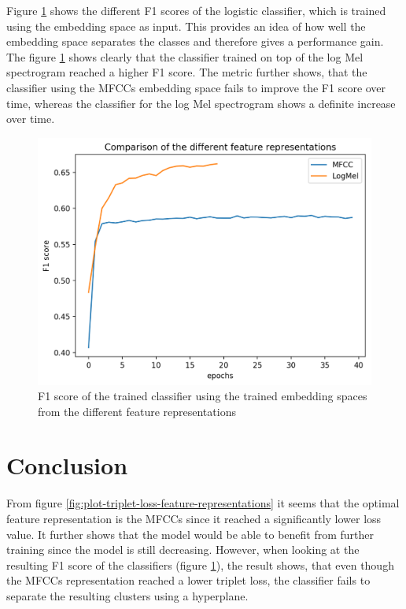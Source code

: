 \documentclass[twocolumn]{article}
\begin{document}
Figure \ref{fig:classifier-f1-feature-represenations} shows the different F1 scores of the logistic classifier, which is trained using the embedding space as input. This provides an idea of how well the embedding space separates the classes and therefore gives a performance gain. The figure \ref{fig:classifier-f1-feature-represenations} shows clearly that the classifier trained on top of the log Mel spectrogram reached a higher F1 score. The metric further shows, that the classifier using the MFCCs embedding space fails to improve the F1 score over time, whereas the classifier for the log Mel spectrogram shows a definite increase over time.

\begin{figure}[t]
\centering
    \includegraphics[width=\linewidth]{assets/f1_feature_representation.png}
    \caption{F1 score of the trained classifier using the trained embedding spaces from the different feature representations}
    \label{fig:classifier-f1-feature-represenations}
\end{figure}

\section{Conclusion}
From figure \ref{fig:plot-triplet-loss-feature-representations} it seems that the optimal feature representation is the MFCCs since it reached a significantly lower loss value. It further shows that the model would be able to benefit from further training since the model is still decreasing. However, when looking at the resulting F1 score of the classifiers (figure \ref{fig:classifier-f1-feature-represenations}), the result shows, that even though the MFCCs representation reached a lower triplet loss, the classifier fails to separate the resulting clusters using a hyperplane. 
\end{document}
